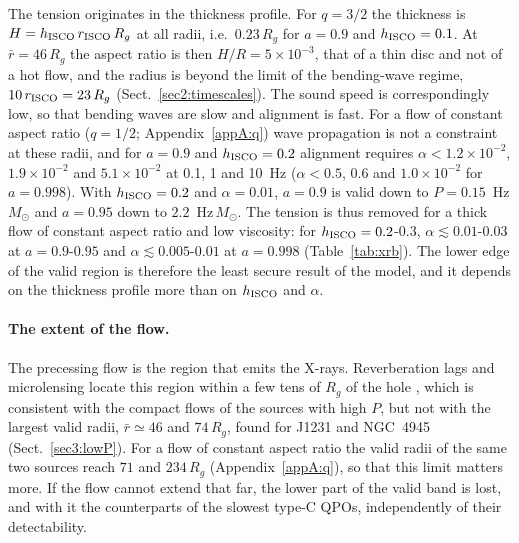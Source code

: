 The tension originates in the thickness profile.
For $q=3/2$ the thickness is $H=h_\textup{ISCO}\,r_\textup{ISCO}\,R_g$ at all radii, i.e.\ $0.23\,R_g$ for $a=0.9$ and $h_\textup{ISCO}=0.1$.
At $\bar r=46\,R_g$ the aspect ratio is then $H/R=5\times10^{-3}$, that of a thin disc and not of a hot flow, and the radius is beyond the limit of the bending-wave regime, $10\,r_\textup{ISCO}=23\,R_g$ (Sect.~\ref{sec2:timescales}).
The sound speed is correspondingly low, so that bending waves are slow and alignment is fast.
For a flow of constant aspect ratio ($q=1/2$; Appendix~\ref{appA:q}) wave propagation is not a constraint at these radii, and for $a=0.9$ and $h_\textup{ISCO}=0.2$ alignment requires $\alpha<1.2\times10^{-2}$, $1.9\times10^{-2}$ and $5.1\times10^{-2}$ at 0.1, 1 and 10~Hz ($\alpha<0.5$, $0.6$ and $1.0\times10^{-2}$ for $a=0.998$).
With $h_\textup{ISCO}=0.2$ and $\alpha=0.01$, $a=0.9$ is valid down to $P=0.15$~Hz\,$M_\odot$ and $a=0.95$ down to $2.2$~Hz\,$M_\odot$.
The tension is thus removed for a thick flow of constant aspect ratio and low viscosity: for $h_\textup{ISCO}=0.2$-$0.3$, $\alpha\lesssim0.01$-$0.03$ at $a=0.9$-$0.95$ and $\alpha\lesssim0.005$-$0.01$ at $a=0.998$ (Table~\ref{tab:xrb}).
The lower edge of the valid region is therefore the least secure result of the model, and it depends on the thickness profile more than on $h_\textup{ISCO}$ and $\alpha$.

\paragraph{The extent of the flow.}
The precessing flow is the region that emits the X-rays.
Reverberation lags and microlensing locate this region within a few tens of $R_g$ of the hole \citep[e.g.][]{Uttley2014}, which is consistent with the compact flows of the sources with high $P$, but not with the largest valid radii, $\bar r\simeq46$ and $74\,R_g$, found for J1231 and NGC~4945 (Sect.~\ref{sec3:lowP}).
For a flow of constant aspect ratio the valid radii of the same two sources reach $71$ and $234\,R_g$ (Appendix~\ref{appA:q}), so that this limit matters more.
If the flow cannot extend that far, the lower part of the valid band is lost, and with it the counterparts of the slowest type-C QPOs, independently of their detectability.


